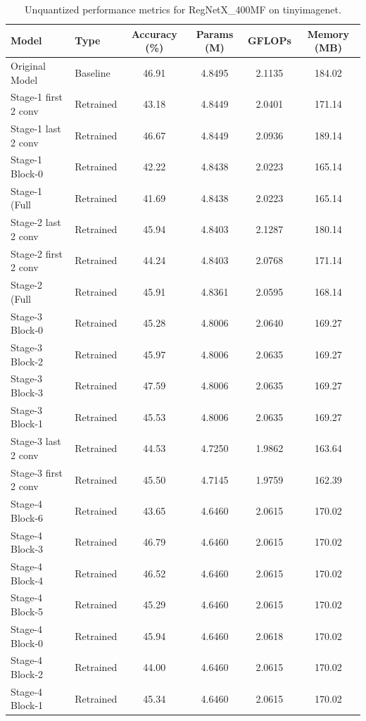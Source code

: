 \begin{table}
\caption{Unquantized performance metrics for RegNetX_400MF on tinyimagenet.}
\label{tab:RegNetX_400MF_tinyimagenet_unquant}
\begin{tabular}{llcccc}
\toprule
Model & Type & Accuracy (\%) & Params (M) & GFLOPs & Memory (MB) \\
\midrule
Original Model & Baseline & 46.91 & 4.8495 & 2.1135 & 184.02 \\
Stage-1 first 2 conv & Retrained & 43.18 & 4.8449 & 2.0401 & 171.14 \\
Stage-1 last 2 conv & Retrained & 46.67 & 4.8449 & 2.0936 & 189.14 \\
Stage-1 Block-0 & Retrained & 42.22 & 4.8438 & 2.0223 & 165.14 \\
Stage-1 (Full & Retrained & 41.69 & 4.8438 & 2.0223 & 165.14 \\
Stage-2 last 2 conv & Retrained & 45.94 & 4.8403 & 2.1287 & 180.14 \\
Stage-2 first 2 conv & Retrained & 44.24 & 4.8403 & 2.0768 & 171.14 \\
Stage-2 (Full & Retrained & 45.91 & 4.8361 & 2.0595 & 168.14 \\
Stage-3 Block-0 & Retrained & 45.28 & 4.8006 & 2.0640 & 169.27 \\
Stage-3 Block-2 & Retrained & 45.97 & 4.8006 & 2.0635 & 169.27 \\
Stage-3 Block-3 & Retrained & 47.59 & 4.8006 & 2.0635 & 169.27 \\
Stage-3 Block-1 & Retrained & 45.53 & 4.8006 & 2.0635 & 169.27 \\
Stage-3 last 2 conv & Retrained & 44.53 & 4.7250 & 1.9862 & 163.64 \\
Stage-3 first 2 conv & Retrained & 45.50 & 4.7145 & 1.9759 & 162.39 \\
Stage-4 Block-6 & Retrained & 43.65 & 4.6460 & 2.0615 & 170.02 \\
Stage-4 Block-3 & Retrained & 46.79 & 4.6460 & 2.0615 & 170.02 \\
Stage-4 Block-4 & Retrained & 46.52 & 4.6460 & 2.0615 & 170.02 \\
Stage-4 Block-5 & Retrained & 45.29 & 4.6460 & 2.0615 & 170.02 \\
Stage-4 Block-0 & Retrained & 45.94 & 4.6460 & 2.0618 & 170.02 \\
Stage-4 Block-2 & Retrained & 44.00 & 4.6460 & 2.0615 & 170.02 \\
Stage-4 Block-1 & Retrained & 45.34 & 4.6460 & 2.0615 & 170.02 \\

\end{tabular}
\end{table}
